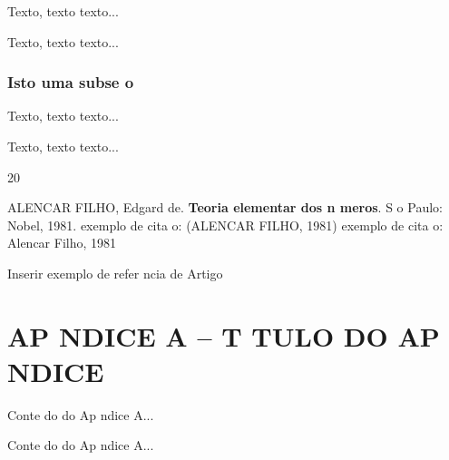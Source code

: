 \documentclass{article}
\begin{document}
Texto, texto texto...

Texto, texto texto...

\subsection{Isto   uma subse o}

Texto, texto texto...

Texto, texto texto...


\begin{thebibliography}{20}
\thispagestyle{myheadings}

ALENCAR FILHO, Edgard de. \textbf{Teoria elementar dos n meros}. S o Paulo: Nobel, 1981.
exemplo de cita o: (ALENCAR FILHO, 1981)
exemplo de cita o: Alencar Filho, 1981

Inserir exemplo de refer ncia de Artigo






\end{thebibliography}



\setcounter{chapter}{0}
\renewcommand{\thechapter}{\Alph{chapter}}
\chapter*{\hfill AP NDICE A -- T TULO DO AP NDICE \hfill}
\thispagestyle{myheadings}

Conte do do Ap ndice A...

Conte do do Ap ndice A...
\end{document}
